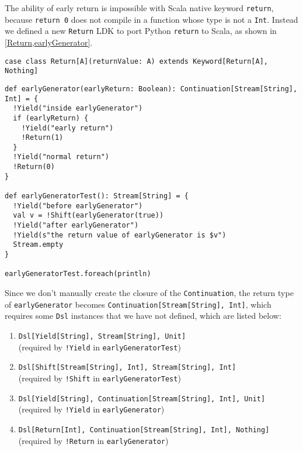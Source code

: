 The ability of early return is impossible with Scala native keyword \lstinline{return}, because \lstinline{return 0} does not compile in a function whose type is not a \lstinline{Int}. Instead we defined a new \lstinline{Return} LDK to port Python \lstinline{return} to Scala, as shown in \cref{Return,earlyGenerator}.

\begin{lstlisting}[caption={The definition of \lstinline{Return} LDK},label={Return}]
case class Return[A](returnValue: A) extends Keyword[Return[A], Nothing]
\end{lstlisting}

\begin{lstlisting}[caption={Use \lstinline{Shift} and \lstinline{Return} in LDK-based generators},label={earlyGenerator}]
def earlyGenerator(earlyReturn: Boolean): Continuation[Stream[String], Int] = {
  !Yield("inside earlyGenerator")
  if (earlyReturn) {
    !Yield("early return")
    !Return(1)
  }
  !Yield("normal return")
  !Return(0)
}

def earlyGeneratorTest(): Stream[String] = {
  !Yield("before earlyGenerator")
  val v = !Shift(earlyGenerator(true))
  !Yield("after earlyGenerator")
  !Yield(s"the return value of earlyGenerator is $v")
  Stream.empty
}

earlyGeneratorTest.foreach(println)
\end{lstlisting}

Since we don't manually create the closure of the \lstinline{Continuation}, the return type of \lstinline{earlyGenerator} becomes \lstinline{Continuation[Stream[String], Int]}, which requires some \lstinline{Dsl} instances that we have not defined, which are listed below:

\begin{enumerate}
  \item \lstinline{Dsl[Yield[String], Stream[String], Unit]} \\ (required by \lstinline{!Yield} in \lstinline{earlyGeneratorTest})
  \label{DslYield}

  \item \lstinline{Dsl[Shift[Stream[String], Int], Stream[String], Int]} \\ (required by \lstinline{!Shift} in \lstinline{earlyGeneratorTest})
  \label{DslShift}
  
  \item \lstinline{Dsl[Yield[String], Continuation[Stream[String], Int], Unit]} \\ (required by \lstinline{!Yield} in \lstinline{earlyGenerator})
  \label{DslYieldContinuation}
  
  \item \lstinline{Dsl[Return[Int], Continuation[Stream[String], Int], Nothing]} \\ (required by \lstinline{!Return} in \lstinline{earlyGenerator})
  \label{DslReturn}
\end{enumerate}

